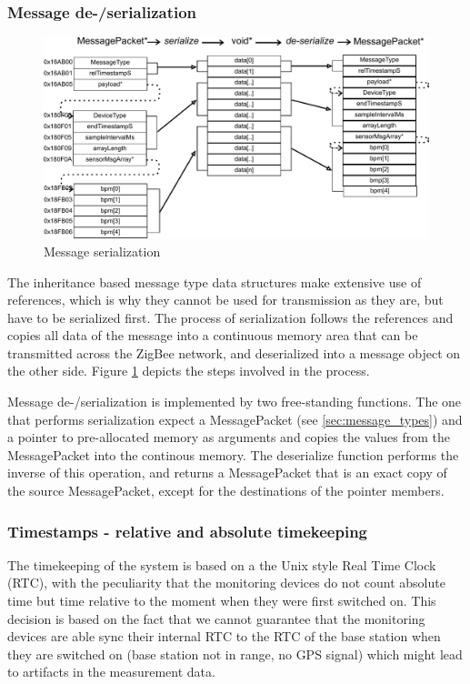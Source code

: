 \subsubsection{Message de-/serialization}
\label{sec:message_serialization}
\begin{figure}
\includegraphics[width=\textwidth]{Images/msg_serialization}
\caption{Message serialization}
\label{fig:msg_serialization}
\end{figure}

The inheritance based message type data structures make extensive use of references, which is why they cannot be used for transmission as they are, but have to be serialized first. The process of serialization follows the references and copies all data of the message into a continuous memory area that can be transmitted across the ZigBee network, and deserialized into a message object on the other side. Figure \ref{fig:msg_serialization} depicts the steps involved in the process.

Message de-/serialization is implemented by two free-standing functions. The one that performs serialization expect a MessagePacket (see \ref{sec:message_types}) and a pointer to pre-allocated memory as arguments and copies the values from the MessagePacket into the continous memory. The deserialize function performs the inverse of this operation, and returns a MessagePacket that is an exact copy of the source MessagePacket, except for the destinations of the pointer members.

\subsubsection{Timestamps - relative and absolute timekeeping}
The timekeeping of the system is based on a the Unix style Real Time Clock (RTC), with the peculiarity that the monitoring devices do not count absolute time but time relative to the moment when they were first switched on. This decision is based on the fact that we cannot guarantee that the monitoring devices are able sync their internal RTC to the RTC of the base station when they are switched on (base station not in range, no GPS signal) which might lead to artifacts in the measurement data.

